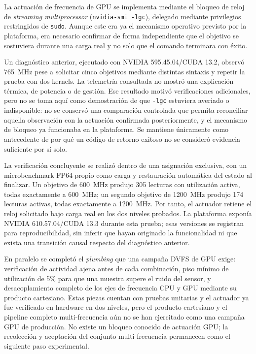 \documentclass[12pt,oneside,spanish]{book}
\begin{document}
La actuación de frecuencia de GPU se implementa mediante el bloqueo de reloj de \textit{streaming multiprocessor} (\texttt{nvidia-smi -lgc}), delegado mediante privilegios restringidos de \texttt{sudo}. Aunque este era ya el mecanismo operativo previsto por la plataforma, era necesario confirmar de forma independiente que el objetivo se sostuviera durante una carga real y no solo que el comando terminara con éxito.

Un diagnóstico anterior, ejecutado con NVIDIA 595.45.04/CUDA 13.2, observó 765~MHz pese a solicitar cinco objetivos mediante distintas sintaxis y repetir la prueba con dos kernels. La telemetría consultada no mostró una explicación térmica, de potencia o de gestión. Ese resultado motivó verificaciones adicionales, pero no se toma aquí como demostración de que \texttt{-lgc} estuviera averiado o indisponible: no se conservó una comparación controlada que permita reconciliar aquella observación con la actuación confirmada posteriormente, y el mecanismo de bloqueo ya funcionaba en la plataforma. Se mantiene únicamente como antecedente de por qué un código de retorno exitoso no se consideró evidencia suficiente por sí solo.

La verificación concluyente se realizó dentro de una asignación exclusiva, con un microbenchmark FP64 propio como carga y restauración automática del estado al finalizar. Un objetivo de 600~MHz produjo 305 lecturas con utilización activa, todas exactamente a 600~MHz; un segundo objetivo de 1200~MHz produjo 174 lecturas activas, todas exactamente a 1200~MHz. Por tanto, el actuador retiene el reloj solicitado bajo carga real en los dos niveles probados. La plataforma exponía NVIDIA 610.57.04/CUDA 13.3 durante esta prueba; esas versiones se registran para reproducibilidad, sin inferir que hayan originado la funcionalidad ni que exista una transición causal respecto del diagnóstico anterior.

En paralelo se completó el \textit{plumbing} que una campaña DVFS de GPU exige: verificación de actividad ajena antes de cada combinación, piso mínimo de utilización de 5\% para que una muestra supere el ruido del sensor, y desacoplamiento completo de los ejes de frecuencia CPU y GPU mediante su producto cartesiano. Estas piezas cuentan con pruebas unitarias y el actuador ya fue verificado en hardware en dos niveles, pero el producto cartesiano y el pipeline completo multi-frecuencia aún no se han ejercitado como una campaña GPU de producción. No existe un bloqueo conocido de actuación GPU; la recolección y aceptación del conjunto multi-frecuencia permanecen como el siguiente paso experimental.
\end{document}
